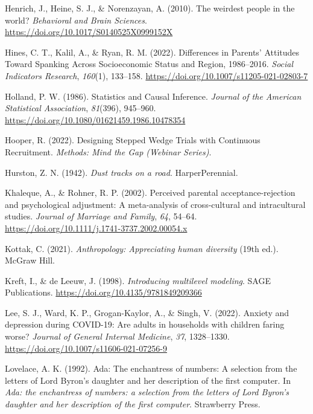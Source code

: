 \documentclass[
  letterpaper,
  DIV=11,
  numbers=noendperiod]{scrreprt}
\newlength{\cslhangindent}
\newlength{\cslentryspacingunit} %
\newenvironment{CSLReferences}[2] %
 {%
  \setlength{\parindent}{0pt}
  \ifodd #1
  \let\oldpar\par
  \def\par{\hangindent=\cslhangindent\oldpar}
  \fi
  \setlength{\parskip}{#2\cslentryspacingunit}
 }%
 {}
\begin{document}
\begin{CSLReferences}{1}{0}
\leavevmode{}%
Henrich, J., Heine, S. J., \& Norenzayan, A. (2010). {The weirdest
people in the world?} \emph{Behavioral and Brain Sciences}.
\url{https://doi.org/10.1017/S0140525X0999152X}

\leavevmode{}%
Hines, C. T., Kalil, A., \& Ryan, R. M. (2022). {Differences in Parents'
Attitudes Toward Spanking Across Socioeconomic Status and Region,
1986--2016}. \emph{Social Indicators Research}, \emph{160}(1), 133--158.
\url{https://doi.org/10.1007/s11205-021-02803-7}

\leavevmode{}%
Holland, P. W. (1986). {Statistics and Causal Inference}. \emph{Journal
of the American Statistical Association}, \emph{81}(396), 945--960.
\url{https://doi.org/10.1080/01621459.1986.10478354}

\leavevmode{}%
Hooper, R. (2022). {Designing Stepped Wedge Trials with Continuous
Recruitment}. \emph{Methods: Mind the Gap (Webinar Series)}.

\leavevmode{}%
Hurston, Z. N. (1942). \emph{Dust tracks on a road}. HarperPerennial.

\leavevmode{}%
Khaleque, A., \& Rohner, R. P. (2002). Perceived parental
acceptance-rejection and psychological adjustment: A meta-analysis of
cross-cultural and intracultural studies. \emph{Journal of Marriage and
Family}, \emph{64}, 54--64.
\url{https://doi.org/10.1111/j.1741-3737.2002.00054.x}

\leavevmode{}%
Kottak, C. (2021). \emph{Anthropology: Appreciating human diversity}
(19th ed.). McGraw Hill.

\leavevmode{}%
Kreft, I., \& de Leeuw, J. (1998). \emph{Introducing multilevel
modeling}. SAGE Publications.
\url{https://doi.org/10.4135/9781849209366}

\leavevmode{}%
Lee, S. J., Ward, K. P., Grogan-Kaylor, A., \& Singh, V. (2022). Anxiety
and depression during {COVID-19}: Are adults in households with children
faring worse? \emph{Journal of General Internal Medicine}, \emph{37},
1328--1330. \url{https://doi.org/10.1007/s11606-021-07256-9}

\leavevmode{}%
Lovelace, A. K. (1992). Ada: The enchantress of numbers: A selection
from the letters of {L}ord {B}yron's daughter and her description of the
first computer. In \emph{Ada: the enchantress of numbers: a selection
from the letters of {L}ord {B}yron's daughter and her description of the
first computer}. Strawberry Press.


\end{CSLReferences}
\end{document}
